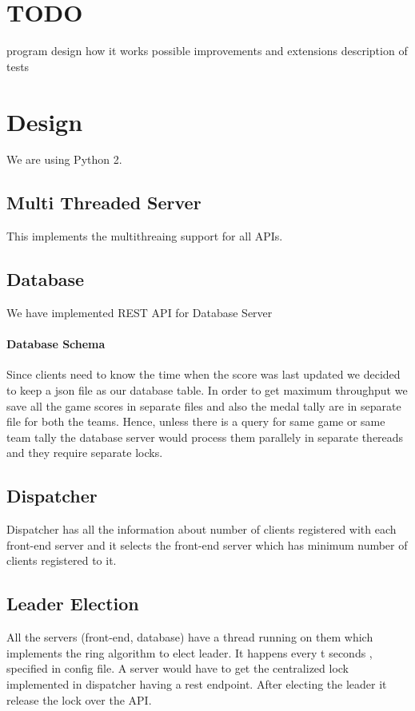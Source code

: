 \documentclass{article}
\begin{document}
\section{TODO}
program design 
how it works
possible improvements and extensions
description of tests

\section{Design}
We are using Python 2.

\subsection{Multi Threaded Server}
This implements the multithreaing support for all APIs.
\subsection{Database}
We have implemented REST API for Database Server

\paragraph{Database Schema}
Since clients need to know the time when the score was last updated we 
decided to keep a json file as our database table. In order to get 
maximum throughput we save all the game scores in separate files and 
also the medal tally are in separate file for both the teams. Hence, 
unless there is a query for same game or same team tally the database
server would process them parallely in separate thereads and they 
require separate locks.

\subsection{Dispatcher}
Dispatcher has all the information about number of clients registered with each front-end server and it selects the front-end server which has minimum number of clients registered to it.

\subsection{Leader Election}
All the servers (front-end, database) have a thread running on them which implements the ring algorithm to elect leader. It happens every t seconds , specified in config file. A server would have to get the centralized lock implemented in dispatcher having a rest endpoint. After electing the leader it release the lock over the API.
\end{document}
